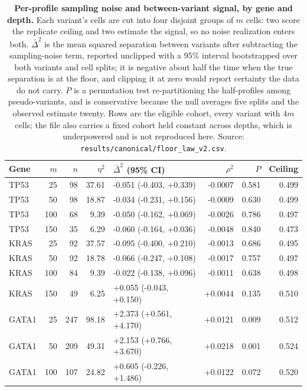 \documentclass[11pt,letterpaper]{article}
\begin{document}
\begin{table}[H]
\centering
\caption{\textbf{Per-profile sampling noise and between-variant signal, by gene and depth.} Each variant's cells are cut into four disjoint groups of $m$ cells: two score the replicate ceiling and two estimate the signal, so no noise realization enters both. $\bar{\Delta}^2$ is the mean squared separation between variants after subtracting the sampling-noise term, reported unclipped with a 95\% interval bootstrapped over both variants and cell splits; it is negative about half the time when the true separation is at the floor, and clipping it at zero would report certainty the data do not carry. $P$ is a permutation test re-partitioning the half-profiles among pseudo-variants, and is conservative because the null averages five splits and the observed estimate twenty. Rows are the eligible cohort, every variant with $4m$ cells; the file also carries a fixed cohort held constant across depths, which is underpowered and is not reproduced here. Source: \texttt{results/canonical/floor\_law\_v2.csv}.}
\label{tab:signal}
\small
\begin{tabular}{@{}l r r r l r r r@{}}
\toprule
Gene & $m$ & $n$ & $\eta^2$ & $\bar{\Delta}^2$ (95\% CI) & $\rho^2$ & $P$ & Ceiling \\
\midrule
TP53 & 25 & 98 & 37.61 & -0.051 (-0.403, +0.339) & -0.0007 & 0.581 & 0.499 \\
TP53 & 50 & 98 & 18.87 & -0.034 (-0.231, +0.156) & -0.0009 & 0.630 & 0.499 \\
TP53 & 100 & 68 & 9.39 & -0.050 (-0.162, +0.069) & -0.0026 & 0.786 & 0.497 \\
TP53 & 150 & 35 & 6.29 & -0.060 (-0.164, +0.036) & -0.0048 & 0.840 & 0.473 \\
KRAS & 25 & 92 & 37.57 & -0.095 (-0.400, +0.210) & -0.0013 & 0.686 & 0.495 \\
KRAS & 50 & 92 & 18.78 & -0.066 (-0.247, +0.108) & -0.0017 & 0.757 & 0.497 \\
KRAS & 100 & 84 & 9.39 & -0.022 (-0.138, +0.096) & -0.0011 & 0.638 & 0.498 \\
KRAS & 150 & 49 & 6.25 & +0.055 (-0.043, +0.150) & +0.0044 & 0.135 & 0.510 \\
GATA1 & 25 & 247 & 98.18 & +2.373 (+0.561, +4.170) & +0.0121 & 0.009 & 0.512 \\
GATA1 & 50 & 209 & 49.31 & +2.153 (+0.766, +3.670) & +0.0218 & 0.001 & 0.524 \\
GATA1 & 100 & 107 & 24.82 & +0.605 (-0.226, +1.486) & +0.0122 & 0.072 & 0.520 \\

\end{tabular}
\end{table}
\end{document}
